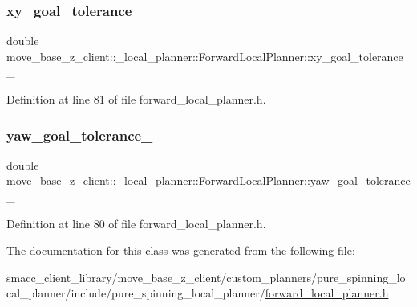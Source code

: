 \subsubsection{\texorpdfstring{xy\+\_\+goal\+\_\+tolerance\+\_\+}{xy\_goal\_tolerance\_}}
{\footnotesize\ttfamily double move\+\_\+base\+\_\+z\+\_\+client\+::\+\_\+local\+\_\+planner\+::\+Forward\+Local\+Planner\+::xy\+\_\+goal\+\_\+tolerance\+\_\+\hspace{0.3cm}{\ttfamily [private]}}



Definition at line 81 of file forward\+\_\+local\+\_\+planner.\+h.

\mbox{\label{classmove__base__z__client_1_1__local__planner_1_1ForwardLocalPlanner_a4776a294e078b1653e3a18319eeeb09b}} 
\subsubsection{\texorpdfstring{yaw\+\_\+goal\+\_\+tolerance\+\_\+}{yaw\_goal\_tolerance\_}}
{\footnotesize\ttfamily double move\+\_\+base\+\_\+z\+\_\+client\+::\+\_\+local\+\_\+planner\+::\+Forward\+Local\+Planner\+::yaw\+\_\+goal\+\_\+tolerance\+\_\+\hspace{0.3cm}{\ttfamily [private]}}



Definition at line 80 of file forward\+\_\+local\+\_\+planner.\+h.



The documentation for this class was generated from the following file\+:\begin{DoxyCompactItemize}
\item 
smacc\+\_\+client\+\_\+library/move\+\_\+base\+\_\+z\+\_\+client/custom\+\_\+planners/pure\+\_\+spinning\+\_\+local\+\_\+planner/include/pure\+\_\+spinning\+\_\+local\+\_\+planner/\hyperlink{pure__spinning__local__planner_2include_2pure__spinning__local__planner_2forward__local__planner_8h}{forward\+\_\+local\+\_\+planner.\+h}\end{DoxyCompactItemize}
